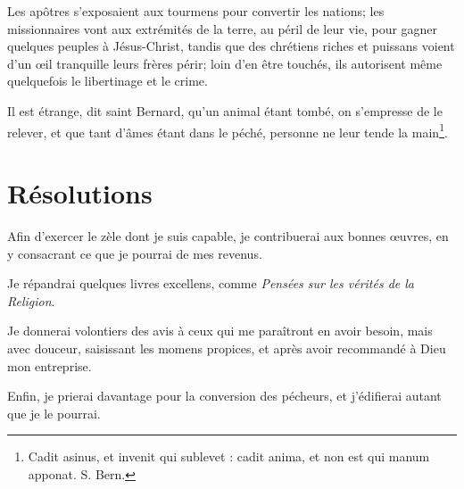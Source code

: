 \documentclass[instructions.tex]{subfiles}
\begin{document}
Les apôtres s’exposaient aux tourmens pour convertir les nations; les missionnaires vont aux extrémités de la terre, au péril de leur vie, pour gagner quelques peuples à Jésus-Christ, tandis que des chrétiens riches et puissans voient d’un œil tranquille leurs frères périr; loin d’en être touchés, ils autorisent même quelquefois le libertinage et le crime.
 
Il est étrange, dit saint Bernard, qu’un animal étant tombé, on s’empresse de le relever, et que tant d’âmes étant dans le péché, personne ne leur tende la main\footnote{Cadit asinus, et invenit qui sublevet : cadit anima, et non est qui manum apponat. S. Bern.}.
 
\section{Résolutions}
 
\primo Afin d’exercer le zèle dont je suis capable, je contribuerai aux bonnes œuvres, en y consacrant ce que je pourrai de mes revenus.
 
\secundo Je répandrai quelques livres excellens, comme \textit{Pensées sur les vérités de la Religion}.
 
\tertio Je donnerai volontiers des avis à ceux qui me paraîtront en avoir besoin, mais avec douceur, saisissant les momens propices, et après avoir recommandé à Dieu mon entreprise.
 
\quarto Enfin, je prierai davantage pour la conversion des pécheurs, et j’édifierai autant que je le pourrai. 

 
\end{document}
